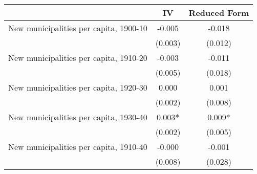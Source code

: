  \begin{tabular}{l*{2}{c}} \toprule
                &\multicolumn{1}{c}{IV}&\multicolumn{1}{c}{Reduced Form}\\
\midrule
New municipalities per capita, 1900-10&   -0.005   &   -0.018   \\
                &  (0.003)   &  (0.012)   \\
\addlinespace
New municipalities per capita, 1910-20&   -0.003   &   -0.011   \\
                &  (0.005)   &  (0.018)   \\
\addlinespace
New municipalities per capita, 1920-30&    0.000   &    0.001   \\
                &  (0.002)   &  (0.008)   \\
\addlinespace
New municipalities per capita, 1930-40&    0.003*  &    0.009*  \\
                &  (0.002)   &  (0.005)   \\
\addlinespace
New municipalities per capita, 1910-40&   -0.000   &   -0.001   \\
                &  (0.008)   &  (0.028)   \\
 \bottomrule \end{tabular}
